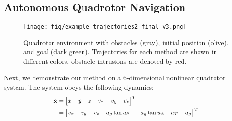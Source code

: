 \subsection{\label{case_drone6D}Autonomous Quadrotor Navigation}
%
\begin{figure}[h]
\begin{center}
\vspace{-0.5em}
\texttt{[image: fig/example\_trajectories2\_final\_v3.png]}
\caption{Quadrotor environment with obstacles (gray), initial position (olive), and goal (dark green). Trajectories for each method are shown in different colors, obstacle intrusions are denoted by red.}
\vspace{-1.5em}
\label{fig:quadrotor}
\end{center}
\end{figure}
%
Next, we demonstrate our method on a 6-dimensional nonlinear quadrotor system. 
The system obeys the following dynamics:
%
\begin{equation} \fontsize{8.5}{10}\selectfont
\begin{aligned}
    \dot{\state} &= \begin{bmatrix} \dot{x} & \dot{y} & \dot{z} & \dot{v_x} & \dot{v_y} & \dot{v_z} \end{bmatrix}^T \\
    &= \begin{bmatrix} v_x & v_y & v_z & a_g \tan u_\theta & -a_g \tan u_\phi & u_T - a_g \end{bmatrix}^T
\end{aligned}
\end{equation}

